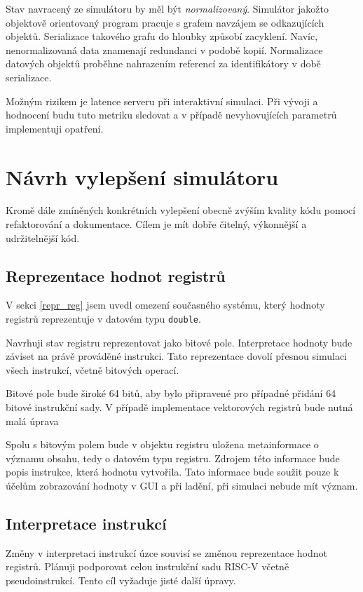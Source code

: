 Stav navracený ze simulátoru by měl být \emph{normalizovaný}.
Simulátor jakožto objektově orientovaný program pracuje s grafem navzájem se odkazujících objektů.
Serializace takového grafu do hloubky způsobí zacyklení.
Navíc, nenormalizovaná data znamenají redundanci v podobě kopií.
Normalizace datových objektů proběhne nahrazením referencí za identifikátory v době serializace.

Možným rizikem je latence serveru při interaktivní simulaci.
Při vývoji a hodnocení budu tuto metriku sledovat a v případě nevyhovujících parametrů implementuji opatření.

\section{Návrh vylepšení simulátoru}

Kromě dále zmíněných konkrétních vylepšení obecně zvýším kvality kódu pomocí refaktorování a dokumentace.
Cílem je mít dobře čitelný, výkonnější a udržitelnější kód.

\subsection{Reprezentace hodnot registrů}

V sekci \ref{repr_reg} jsem uvedl omezení současného systému, který hodnoty registrů reprezentuje v datovém typu \texttt{double}. 

Navrhuji stav registru reprezentovat jako bitové pole.
Interpretace hodnoty bude záviset na právě prováděné instrukci.
Tato reprezentace dovolí přesnou simulaci všech instrukcí, včetně bitových operací.

Bitové pole bude široké 64 bitů, aby bylo připravené pro případné přidání 64 bitové instrukční sady.
V případě implementace vektorových registrů bude nutná malá úprava

Spolu s bitovým polem bude v objektu registru uložena metainformace o významu obsahu, tedy o datovém typu registru. Zdrojem této informace bude popis instrukce, která hodnotu vytvořila.
Tato informace bude soužit pouze k účelům zobrazování hodnoty v GUI a při ladění, při simulaci nebude mít význam.

\subsection{Interpretace instrukcí}

Změny v interpretaci instrukcí úzce souvisí se změnou reprezentace hodnot registrů. Plánuji podporovat celou instrukční sadu RISC-V včetně pseudoinstrukcí. Tento cíl vyžaduje jisté další úpravy.

